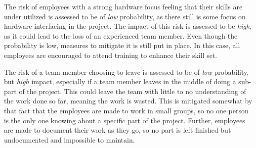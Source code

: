 \documentclass[Main]{subfiles}
\begin{document}
	The risk of employees with a strong hardware focus feeling that their skills are under utilized is assessed to be of \emph{low} probability, as there still is some focus on hardware interfacing in the project.
	The impact of this risk is assessed to be \emph{high}, as it could lead to the loss of an experienced team member.
	Even though the probability is low, measures to mitigate it is still put in place.
	In this case, all employees are encouraged to attend training to enhance their skill set.

	The risk of a team member choosing to leave is assessed to be of \emph{low} probability, but \emph{high} impact, especially if a team member leaves in the middle of doing a sub-part of the project. 
	This could leave the team with little to no understanding of the work done so far, meaning the work is wasted.
	This is mitigated somewhat by that fact that the employees are made to work in small groups, so no one person is the only one knowing about a specific part of the project.
	Further, employees are made to document their work as they go, so no part 
	is left finished but undocumented and impossible to maintain.







\end{document}
